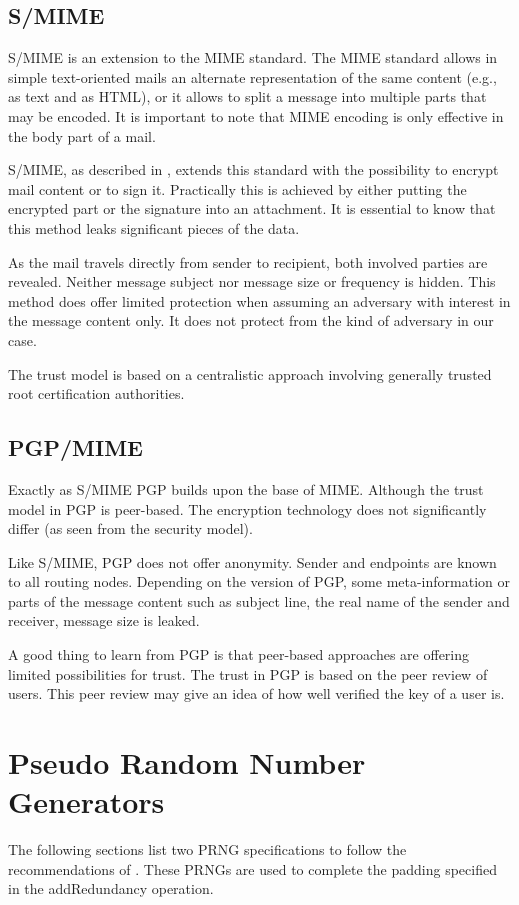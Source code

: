 \subsection{S/MIME}
S/MIME is an extension to the MIME standard. The MIME standard allows in simple text-oriented mails an alternate representation of the same content (e.g., as text and as HTML), or it allows to split a message into multiple parts that may be encoded. It is important to note that MIME encoding is only effective in the body part of a mail.

S/MIME, as described in \cite{RFC3851}, extends this standard with the possibility to encrypt mail content or to sign it. Practically this is achieved by either putting the encrypted part or the signature into an attachment. It is essential to know that this method leaks significant pieces of the data.

As the mail travels directly from sender to recipient, both involved parties are revealed. Neither message subject nor message size or frequency is hidden. This method does offer limited protection when assuming an adversary with interest in the message content only. It does not protect from the kind of adversary in our case. 

The trust model is based on a centralistic approach involving generally trusted root certification authorities.

\subsection{PGP/MIME}
Exactly as S/MIME PGP\cite{rfc4880} builds upon the base of MIME. Although the trust model in PGP is peer-based. The encryption technology does not significantly differ (as seen from the security model).

Like S/MIME, PGP does not offer anonymity. Sender and endpoints are known to all routing nodes. Depending on the version of PGP, some meta-information or parts of the message content such as subject line, the real name of the sender and receiver, message size is leaked.

A good thing to learn from PGP is that peer-based approaches are offering limited possibilities for trust. The trust in PGP is based on the peer review of users. This peer review may give an idea of how well verified the key of a user is.


\section{Pseudo Random Number Generators \label{sec:prng}}
The following sections list two PRNG specifications to follow the recommendations of \cite{rfc1750}. These PRNGs are used to complete the padding specified in the addRedundancy operation.

